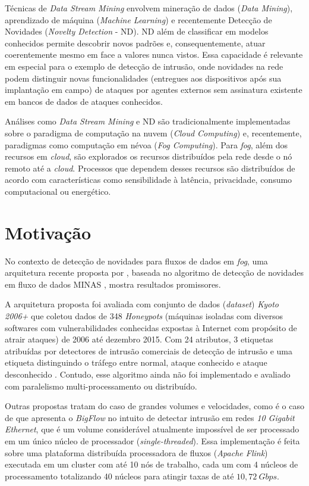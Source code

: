 Técnicas de \emph{Data Stream Mining} envolvem mineração de dados
(\emph{Data Mining}), aprendizado de
máquina (\emph{Machine Learning}) e recentemente Detecção de Novidades
(\emph{Novelty Detection} - ND). ND além de classificar em modelos conhecidos
permite descobrir novos padrões e, consequentemente, atuar coerentemente mesmo
em face a valores nunca vistos. Essa capacidade é relevante em especial para o
exemplo de detecção de intrusão, onde novidades na rede podem distinguir novas
funcionalidades (entregues aos dispositivos após sua implantação em campo) de
ataques por agentes externos sem assinatura existente em bancos de
dados de ataques conhecidos.


Análises como \emph{Data Stream Mining} e ND são tradicionalmente implementadas
sobre o paradigma de computação na nuvem
(\emph{Cloud Computing}) e, recentemente, paradigmas como computação em névoa
(\emph{Fog Computing}). Para \emph{fog}, além dos recursos em \emph{cloud}, são
explorados os recursos distribuídos pela rede desde o nó remoto até a
\emph{cloud}. Processos que dependem desses recursos são distribuídos de acordo
com características como sensibilidade à latência, privacidade,
consumo computacional ou energético.

\section{Motivação}

No contexto de detecção de novidades para fluxos de dados em \emph{fog}, uma
arquitetura recente proposta por , baseada no algoritmo
de detecção de novidades em fluxo de dados MINAS
\cite{Faria2016minas}, mostra resultados promissores.

A arquitetura proposta foi avaliada com conjunto de dados (\emph{dataset}) \emph{Kyoto 2006+} que
coletou dados de 348 \emph{Honeypots} (máquinas isoladas com diversos softwares
com vulnerabilidades conhecidas expostas à Internet com propósito de atrair
ataques) de 2006 até dezembro 2015. Com 24 atributos, 3 etiquetas atribuídas por
detectores de intrusão comerciais de detecção de intrusão e uma etiqueta
distinguindo o tráfego entre normal, ataque conhecido e ataque desconhecido
\cite{Cassales2019a}.
Contudo, esse algoritmo ainda não foi implementado e avaliado com paralelismo
multi-processamento ou distribuído.

Outras propostas tratam do caso de grandes volumes e velocidades, como é o caso
de  que apresenta o \emph{BigFlow} no intuito de detectar
intrusão em redes \emph{10 Gigabit Ethernet}, que é um volume considerável
atualmente impossível de ser processado em um único núcleo de processador
(\emph{single-threaded}). Essa implementação é feita sobre uma plataforma
distribuída processadora de fluxos (\emph{Apache Flink}) executada em um cluster
com até 10 nós de trabalho, cada um com 4 núcleos de processamento totalizando
40 núcleos para atingir taxas de até $10,72 \ Gbps$.

